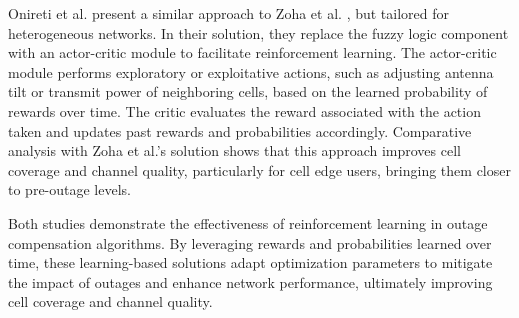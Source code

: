 Onireti et al. \cite{onireti2015cell} present a similar approach to Zoha et al. \cite{zoha2016learning}, but tailored for heterogeneous networks. In their solution, they replace the fuzzy logic component with an actor-critic module to facilitate reinforcement learning. The actor-critic module performs exploratory or exploitative actions, such as adjusting antenna tilt or transmit power of neighboring cells, based on the learned probability of rewards over time. The critic evaluates the reward associated with the action taken and updates past rewards and probabilities accordingly. Comparative analysis with Zoha et al.'s solution shows that this approach improves cell coverage and channel quality, particularly for cell edge users, bringing them closer to pre-outage levels.

Both studies demonstrate the effectiveness of reinforcement learning in outage compensation algorithms. By leveraging rewards and probabilities learned over time, these learning-based solutions adapt optimization parameters to mitigate the impact of outages and enhance network performance, ultimately improving cell coverage and channel quality.


